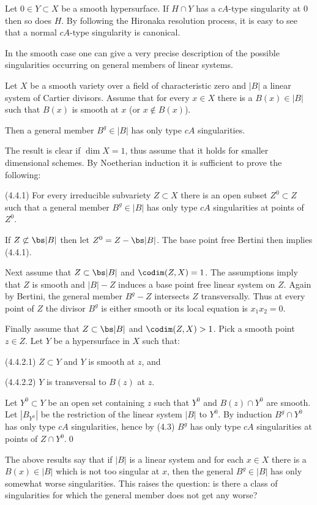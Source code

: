  Let $0\in Y\subset X$ be a smooth hypersurface. If
$H\cap Y$ has a $cA$-type singularity at $0$ then so does $H$.
By following the Hironaka resolution process, it is easy to see that a normal
$cA$-type singularity is canonical. \enddemo


In the smooth case one can give a very precise description of the possible
singularities occurring on general members of linear systems.


  Let $X$ be a smooth variety over a field of
characteristic zero and  $|B|$  
a linear system of Cartier divisors.
Assume that for every $x\in X$ there is a $B(x)\in |B|$ such that $B(x)$ is
 smooth at $x$ (or $x\not\in B(x)$). 

Then a   general  member 
$B^g\in |B|$ has only type $cA$ singularities.
\endproclaim

\demop The result is clear if $\dim X=1$, thus assume that it holds for
smaller dimensional schemes. By Noetherian induction it is sufficient to prove
the following:

(4.4.1) For every irreducible subvariety $Z\subset X$ there is an open subset
$Z^0\subset Z$ such that a   general  member 
$B^g\in |B|$ has only type $cA$ singularities at points of $Z^0$.

If $Z\not\subset \bs|B|$ then let $Z^0=Z-\bs|B|$. The base point free Bertini
then implies (4.4.1).

Next assume that $Z\subset\bs|B|$ and $\codim(Z,X)=1$. The assumptions imply
that $Z$ is smooth  and $|B|-Z$ induces a base point free linear system on $Z$.
Again by Bertini, the general member $B^g-Z$ intersects $Z$ transversally. Thus
at every point of
$Z$ the divisor $B^g$ is either smooth or its local equation is
$x_1x_2=0$.

Finally assume that $Z\subset\bs|B|$ and $\codim(Z,X)>1$. Pick a smooth point 
$z\in Z$. Let $Y$ be a hypersurface in $X$ such that:

(4.4.2.1) $Z\subset Y$ and $Y$ is smooth at $z$, and

(4.4.2.2) $Y$ is transversal to $B(z)$ at $z$.

Let $Y^0\subset Y$ be an open set containing $z$ such that $Y^0$  and $B(z)\cap
Y^0$ are smooth.  Let $|B_{Y^0}|$ be the restriction of  the linear system $|B|$
to $Y^0$.  By induction $B^g\cap Y^0$ has only type $cA$ singularities, hence by
(4.3) $B^g$ has 
 only type $cA$ singularities at points of $Z\cap Y^0$.\qed\enddemo



The above results  say that if $|B|$ is a linear system and for each $x\in
X$ there is a $B(x)\in |B|$ which is not too singular at $x$, then the general
$B^g\in |B|$ has only somewhat worse singularities. This raises the question:
is there a class of singularities for which the general member does not get
any worse?

